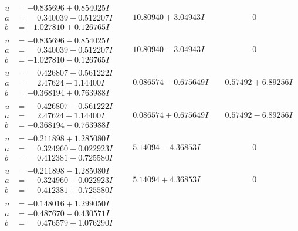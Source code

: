 \documentclass[1p]{elsarticle_modified}
\theoremstyle{definition}
\begin{document}
$$\begin{array}{c|c|c}
\begin{aligned}
u &= -0.835696 + 0.854025 I \\
a &= \phantom{-}0.340039 - 0.512207 I \\
b &= -1.027810 + 0.126765 I\end{aligned}
 & \phantom{-}10.80940 + 3.04943 I & \phantom{-0.000000 } 0 \\ \hline\begin{aligned}
u &= -0.835696 - 0.854025 I \\
a &= \phantom{-}0.340039 + 0.512207 I \\
b &= -1.027810 - 0.126765 I\end{aligned}
 & \phantom{-}10.80940 - 3.04943 I & \phantom{-0.000000 } 0 \\ \hline\begin{aligned}
u &= \phantom{-}0.426807 + 0.561222 I \\
a &= \phantom{-}2.47624 + 1.14400 I \\
b &= -0.368194 + 0.763988 I\end{aligned}
 & \phantom{-}0.086574 - 0.675649 I & \phantom{-}0.57492 + 6.89256 I \\ \hline\begin{aligned}
u &= \phantom{-}0.426807 - 0.561222 I \\
a &= \phantom{-}2.47624 - 1.14400 I \\
b &= -0.368194 - 0.763988 I\end{aligned}
 & \phantom{-}0.086574 + 0.675649 I & \phantom{-}0.57492 - 6.89256 I \\ \hline\begin{aligned}
u &= -0.211898 + 1.285080 I \\
a &= \phantom{-}0.324960 - 0.022923 I \\
b &= \phantom{-}0.412381 - 0.725580 I\end{aligned}
 & \phantom{-}5.14094 - 4.36853 I & \phantom{-0.000000 } 0 \\ \hline\begin{aligned}
u &= -0.211898 - 1.285080 I \\
a &= \phantom{-}0.324960 + 0.022923 I \\
b &= \phantom{-}0.412381 + 0.725580 I\end{aligned}
 & \phantom{-}5.14094 + 4.36853 I & \phantom{-0.000000 } 0 \\ \hline\begin{aligned}
u &= -0.148016 + 1.299050 I \\
a &= -0.487670 - 0.430571 I \\
b &= \phantom{-}0.476579 + 1.076290 I\end{aligned}

\end{array}$$
\end{document}
